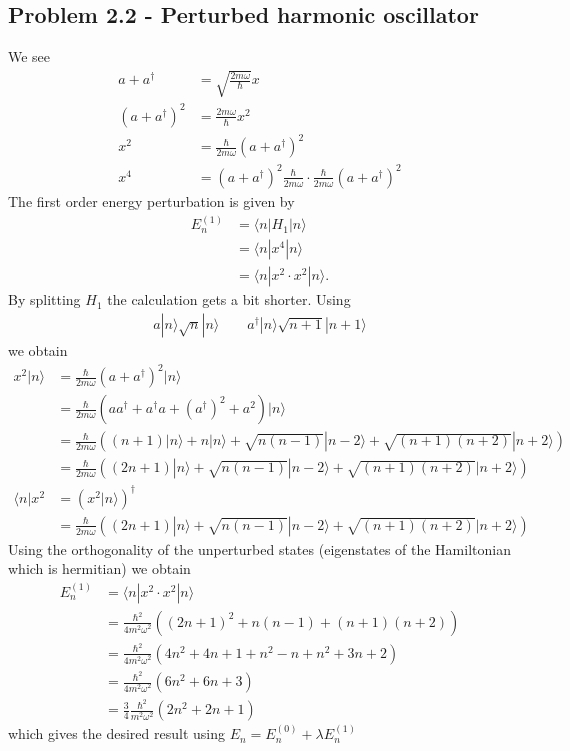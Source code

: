 \documentclass[10pt,a4paper]{book}
\theoremstyle{definition}
\begin{document}
\subsection{Problem 2.2 - Perturbed harmonic oscillator}
We see
\begin{align}
a+a^\dagger&=\sqrt{\frac{2m\omega}{\hbar}}x\\
(a+a^\dagger)^2&=\frac{2m\omega}{\hbar}x^2\\
x^2&=\frac{\hbar}{2m\omega}(a+a^\dagger)^2\\
x^4&=(a+a^\dagger)^2\frac{\hbar}{2m\omega}\cdot\frac{\hbar}{2m\omega}(a+a^\dagger)^2
\end{align}
The first order energy perturbation is given by
\begin{align}
E^{(1)}_n
&=\langle n|H_1|n \rangle\\
&=\langle n|x^4|n \rangle\\
&=\langle n|x^2\cdot x^2|n \rangle.
\end{align}
By splitting $H_1$ the calculation gets a bit shorter. Using
\begin{align}
a|n\rangle\sqrt{n}|n\rangle \qquad a^\dagger|n\rangle\sqrt{n+1}|n+1\rangle
\end{align}
we obtain
\begin{align}
x^2|n \rangle
&=\frac{\hbar}{2m\omega}(a+a^\dagger)^2|n \rangle\\
&=\frac{\hbar}{2m\omega}(aa^\dagger+a^\dagger a+(a^\dagger)^2+a^2)|n \rangle\\
&=\frac{\hbar}{2m\omega}\left((n+1)|n\rangle +n|n\rangle+\sqrt{n(n-1)}|n-2\rangle+\sqrt{(n+1)(n+2)}|n+2\rangle\right)\\
&=\frac{\hbar}{2m\omega}\left((2n+1)|n\rangle +\sqrt{n(n-1)}|n-2\rangle+\sqrt{(n+1)(n+2)}|n+2\rangle\right)\\
\langle n|x^2&=(x^2|n \rangle)^\dagger\\
&=\frac{\hbar}{2m\omega}\left((2n+1)|n\rangle +\sqrt{n(n-1)}|n-2\rangle+\sqrt{(n+1)(n+2)}|n+2\rangle\right)
\end{align}
Using the orthogonality of the unperturbed states (eigenstates of the Hamiltonian which is hermitian) we obtain
\begin{align}
E^{(1)}_n
&=\langle n|x^2\cdot x^2|n \rangle\\
&=\frac{\hbar^2}{4m^2\omega^2}\left((2n+1)^2+n(n-1)+(n+1)(n+2)\right)\\
&=\frac{\hbar^2}{4m^2\omega^2}\left(4n^2+4n+1+n^2-n+n^2+3n+2\right)\\
&=\frac{\hbar^2}{4m^2\omega^2}\left(6n^2+6n+3\right)\\
&=\frac{3}{4}\frac{\hbar^2}{m^2\omega^2}\left(2n^2+2n+1\right)
\end{align}
which gives the desired result using $E_n=E_n^{(0)}+\lambda E_n^{(1)}$
\end{document}
